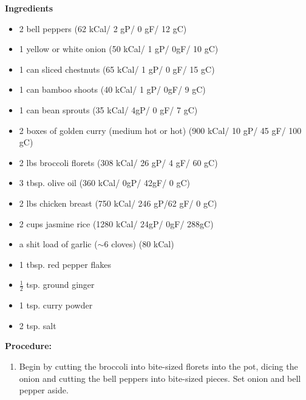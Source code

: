 
    




\bigskip

\bigskip

\begin{multicols}{2}
\textbf{Ingredients}
\begin{itemize}
\item 2 bell peppers \quad (62 kCal/ 2 gP/ 0 gF/ 12 gC)

\item 1 yellow or white onion \quad (50 kCal/ 1 gP/ 0gF/ 10 gC)
\item 1 can sliced chestnuts \quad (65 kCal/ 1 gP/ 0 gF/ 15 gC)
\item 1 can bamboo shoots \quad (40 kCal/ 1 gP/ 0gF/ 9 gC)
\item 1 can bean sprouts \quad (35 kCal/ 4gP/ 0 gF/ 7 gC)
\item 2 boxes of golden curry (medium hot or hot) \newline (900 kCal/ 10 gP/ 45 gF/ 100 gC)
\item 2 lbs broccoli florets \quad (308 kCal/ 26 gP/ 4 gF/ 60 gC)
\item 3 tbsp. olive oil \quad (360 kCal/ 0gP/ 42gF/ 0 gC)
\item 2 lbs chicken breast \quad (750 kCal/ 246 gP/62 gF/ 0 gC)
\item 2 cups jasmine rice \quad (1280 kCal/ 24gP/ 0gF/ 288gC)
\item a shit load of garlic ($\sim$6 cloves) \quad  (80 kCal)
\item 1 tbsp. red pepper flakes
\item $\frac{1}{2}$ tsp. ground ginger
\item 1 tsp. curry powder 
\item 2 tsp. salt

\end{itemize}


\columnbreak
\textbf{Procedure:}
\medskip


\begin{enumerate}
\item 
Begin by cutting the broccoli into bite-sized florets into the pot, dicing the onion and cutting the bell peppers into bite-sized pieces. Set onion and bell pepper aside. 


\end{enumerate}
\end{multicols}

